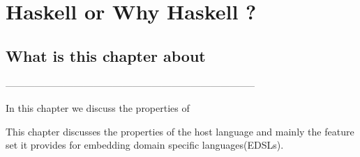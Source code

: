 \documentclass[thesis-solanki.tex]{subfiles}
\begin{document}
\chapter{Haskell or Why Haskell ?}\label{chap:hwh}


\section{What is this chapter about}

-----------------------------------------------------------------------------


In this chapter we discuss the properties of 

This chapter discusses the properties of the host language  and mainly the feature set it
provides for embedding domain specific languages(EDSLs).
\end{document}
